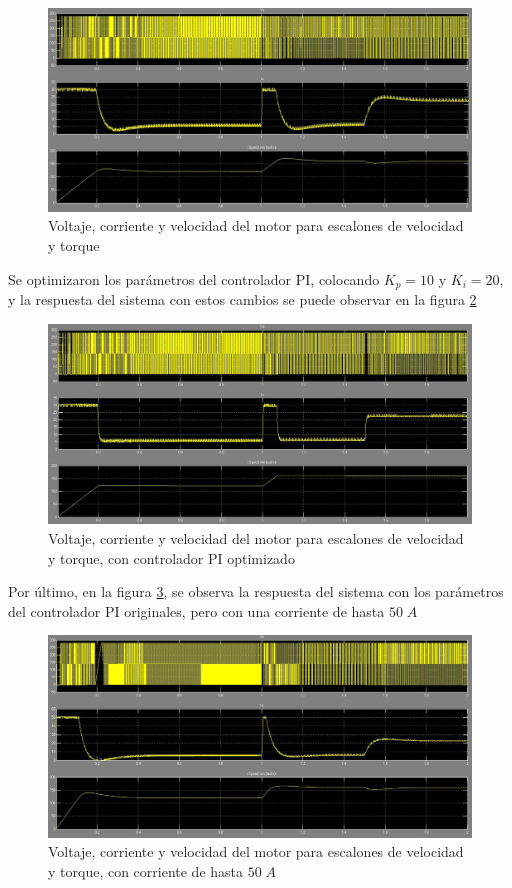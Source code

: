 \documentclass[11pt, a4paper]{article}
\begin{document}
\begin{figure}[H]
 \centering
 \includegraphics[scale=0.4]{imagenes/sim_step.jpg}
 \caption{Voltaje, corriente y velocidad del motor para escalones de velocidad y torque}
 \label{fig:sim_step}
\end{figure}

Se optimizaron los parámetros del controlador PI, colocando $K_p=10$ y $K_i=20$, y la respuesta del sistema con estos cambios se puede observar en la figura \ref{fig:sim_step_optimizado}

\begin{figure}[H]
 \centering
 \includegraphics[scale=0.4]{imagenes/sim_step_optimizado.jpg}
 \caption{Voltaje, corriente y velocidad del motor para escalones de velocidad y torque, con controlador PI optimizado}
 \label{fig:sim_step_optimizado}
\end{figure}


Por último, en la figura \ref{fig:sim_step_limite}, se observa la respuesta del sistema con los parámetros del controlador PI originales, pero con una corriente de hasta $50\;A$

\begin{figure}[H]
 \centering
 \includegraphics[scale=0.4]{imagenes/sim_step_limite.jpg}
 \caption{Voltaje, corriente y velocidad del motor para escalones de velocidad y torque, con corriente de hasta $50\;A$}
 \label{fig:sim_step_limite}
\end{figure}
\end{document}

